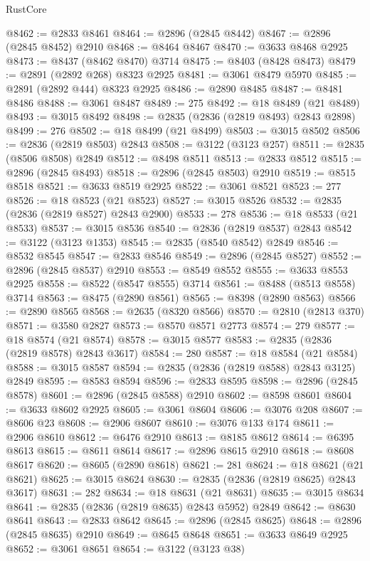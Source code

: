 \begin{lexlean}{RustCore}
\begin{coremodule}
@8462 := @2833 @8461
@8464 := @2896 (@2845 @8442)
@8467 := @2896 (@2845 @8452) @2910
@8468 := @8464 @8467
@8470 := @3633 @8468 @2925
@8473 := @8437 (@8462 @8470) @3714
@8475 := @8403 (@8428 @8473)
@8479 := @2891 (@2892 @268) @8323 @2925
@8481 := @3061 @8479 @5970
@8485 := @2891 (@2892 @444) @8323 @2925
@8486 := @2890 @8485
@8487 := @8481 @8486
@8488 := @3061 @8487
@8489 := 275
@8492 := @18 @8489 (@21 @8489)
@8493 := @3015 @8492
@8498 := @2835 (@2836 (@2819 @8493) @2843 @2898)
@8499 := 276
@8502 := @18 @8499 (@21 @8499)
@8503 := @3015 @8502
@8506 := @2836 (@2819 @8503) @2843
@8508 := @3122 (@3123 @257)
@8511 := @2835 (@8506 @8508) @2849
@8512 := @8498 @8511
@8513 := @2833 @8512
@8515 := @2896 (@2845 @8493)
@8518 := @2896 (@2845 @8503) @2910
@8519 := @8515 @8518
@8521 := @3633 @8519 @2925
@8522 := @3061 @8521
@8523 := 277
@8526 := @18 @8523 (@21 @8523)
@8527 := @3015 @8526
@8532 := @2835 (@2836 (@2819 @8527) @2843 @2900)
@8533 := 278
@8536 := @18 @8533 (@21 @8533)
@8537 := @3015 @8536
@8540 := @2836 (@2819 @8537) @2843
@8542 := @3122 (@3123 @1353)
@8545 := @2835 (@8540 @8542) @2849
@8546 := @8532 @8545
@8547 := @2833 @8546
@8549 := @2896 (@2845 @8527)
@8552 := @2896 (@2845 @8537) @2910
@8553 := @8549 @8552
@8555 := @3633 @8553 @2925
@8558 := @8522 (@8547 @8555) @3714
@8561 := @8488 (@8513 @8558) @3714
@8563 := @8475 (@2890 @8561)
@8565 := @8398 (@2890 @8563)
@8566 := @2890 @8565
@8568 := @2635 (@8320 @8566)
@8570 := @2810 (@2813 @370)
@8571 := @3580 @2827
@8573 := @8570 @8571 @2773
@8574 := 279
@8577 := @18 @8574 (@21 @8574)
@8578 := @3015 @8577
@8583 := @2835 (@2836 (@2819 @8578) @2843 @3617)
@8584 := 280
@8587 := @18 @8584 (@21 @8584)
@8588 := @3015 @8587
@8594 := @2835 (@2836 (@2819 @8588) @2843 @3125) @2849
@8595 := @8583 @8594
@8596 := @2833 @8595
@8598 := @2896 (@2845 @8578)
@8601 := @2896 (@2845 @8588) @2910
@8602 := @8598 @8601
@8604 := @3633 @8602 @2925
@8605 := @3061 @8604
@8606 := @3076 @208
@8607 := @8606 @23
@8608 := @2906 @8607
@8610 := @3076 @133 @174
@8611 := @2906 @8610
@8612 := @6476 @2910
@8613 := @8185 @8612
@8614 := @6395 @8613
@8615 := @8611 @8614
@8617 := @2896 @8615 @2910
@8618 := @8608 @8617
@8620 := @8605 (@2890 @8618)
@8621 := 281
@8624 := @18 @8621 (@21 @8621)
@8625 := @3015 @8624
@8630 := @2835 (@2836 (@2819 @8625) @2843 @3617)
@8631 := 282
@8634 := @18 @8631 (@21 @8631)
@8635 := @3015 @8634
@8641 := @2835 (@2836 (@2819 @8635) @2843 @5952) @2849
@8642 := @8630 @8641
@8643 := @2833 @8642
@8645 := @2896 (@2845 @8625)
@8648 := @2896 (@2845 @8635) @2910
@8649 := @8645 @8648
@8651 := @3633 @8649 @2925
@8652 := @3061 @8651
@8654 := @3122 (@3123 @38)

\end{coremodule}
\end{lexlean}
